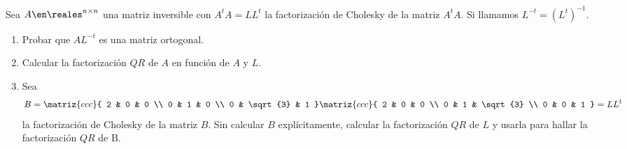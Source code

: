 \begin{enunciado}{\ejExtra}
  Sea $A\en \reales^{n \times n}$ una matriz inversible con $A^t A = L L^t$ la factorización de
  Cholesky de la matriz $A^t A$. Si llamamos $L^{-t} = (L^{t})^{-1}$.
  \begin{enumerate}[label=\alph*)]
    \item Probar que $AL^{-t}$ es una matriz ortogonal.
    \item Calcular la factorización $QR$ de $A$ en función de $A$ y $L$.
    \item Sea
          $$
            B=
            \matriz{ccc}{
              2 & 0 & 0 \\
              0 & 1 & 0 \\
              0 & \sqrt{3} & 1
            }
            \matriz{ccc}{
              2 & 0 & 0 \\
              0 & 1 & \sqrt{3} \\
              0 & 0 & 1
            }
            =L L^t
          $$
          la factorización de Cholesky de la matriz $B$. Sin calcular $B$ explícitamente, calcular
          la factorización $QR$ de $L$ y usarla para hallar la factorización $QR$ de B.
  \end{enumerate}
\end{enunciado}

